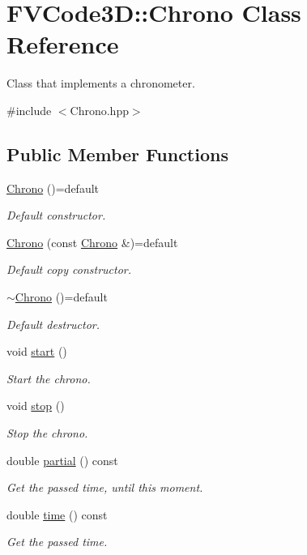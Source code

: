 \hypertarget{classFVCode3D_1_1Chrono}{}\section{F\+V\+Code3D\+:\+:Chrono Class Reference}
\label{classFVCode3D_1_1Chrono}


Class that implements a chronometer.  




{\ttfamily \#include $<$Chrono.\+hpp$>$}

\subsection*{Public Member Functions}
\begin{DoxyCompactItemize}
\item 
\hyperlink{classFVCode3D_1_1Chrono_aa2308dc48aa2934b609c2f66dddb7cba}{Chrono} ()=default
\begin{DoxyCompactList}\small\item\em Default constructor. \end{DoxyCompactList}\item 
\hyperlink{classFVCode3D_1_1Chrono_afa9a3677e0bba53175d47aa057138db1}{Chrono} (const \hyperlink{classFVCode3D_1_1Chrono}{Chrono} \&)=default
\begin{DoxyCompactList}\small\item\em Default copy constructor. \end{DoxyCompactList}\item 
\hyperlink{classFVCode3D_1_1Chrono_a6afbd7ea104fe781b6e9e209172dbb5c}{$\sim$\+Chrono} ()=default
\begin{DoxyCompactList}\small\item\em Default destructor. \end{DoxyCompactList}\item 
void \hyperlink{classFVCode3D_1_1Chrono_a13f2f4fa4096ec9eafa7ad59fea3df87}{start} ()
\begin{DoxyCompactList}\small\item\em Start the chrono. \end{DoxyCompactList}\item 
void \hyperlink{classFVCode3D_1_1Chrono_acc8f31330aa1819b12947866075fbc9e}{stop} ()
\begin{DoxyCompactList}\small\item\em Stop the chrono. \end{DoxyCompactList}\item 
double \hyperlink{classFVCode3D_1_1Chrono_a245a0c47da85e80de56e85d3689b925b}{partial} () const 
\begin{DoxyCompactList}\small\item\em Get the passed time, until this moment. \end{DoxyCompactList}\item 
double \hyperlink{classFVCode3D_1_1Chrono_a4cb287080efc462d06b1af5594c1f976}{time} () const 
\begin{DoxyCompactList}\small\item\em Get the passed time. \end{DoxyCompactList}\end{DoxyCompactItemize}
